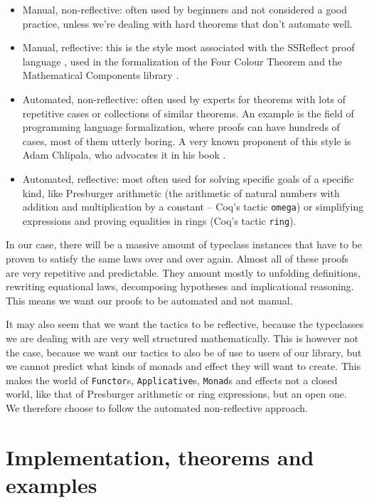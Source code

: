 \documentclass[declaration,inz,english,shortabstract]{iithesis}
\newcommand{\m}[1]{\texttt{#1}}
\begin{document}
\begin{itemize}
    \item Manual, non-reflective: often used by beginners and not considered a good practice, unless we're dealing with hard theorems that don't automate well.
    \item Manual, reflective: this is the style most associated with the SSReflect proof language \cite{SSReflect1} \cite{SSReflect2}, used in the formalization of the Four Colour Theorem \cite{FourColour1} \cite{FourColour2} and the Mathematical Components library \cite{MCB}.
    \item Automated, non-reflective: often used by experts for theorems with lots of repetitive cases or collections of similar theorems. An example is the field of programming language formalization, where proofs can have hundreds of cases, most of them utterly boring. A very known proponent of this style is Adam Chlipala, who advocates it in his book \cite{CPDT}.
    \item Automated, reflective: most often used for solving specific goals of a specific kind, like Presburger arithmetic (the arithmetic of natural numbers with addition and multiplication by a constant -- Coq's tactic \m{omega}) or simplifying expressions and proving equalities in rings (Coq's tactic \m{ring}).
\end{itemize}

In our case, there will be a massive amount of typeclass instances that have to be proven to satisfy the same laws over and over again. Almost all of these proofs are very repetitive and predictable. They amount mostly to unfolding definitions, rewriting equational laws, decomposing hypotheses and implicational reasoning. This means we want our proofs to be automated and not manual.

It may also seem that we want the tactics to be reflective, because the typeclasses we are dealing with are very well structured mathematically. This is however not the case, because we want our tactics to also be of use to users of our library, but we cannot predict what kinds of monads and effect they will want to create. This makes the world of \m{Functor}s, \m{Applicative}s, \m{Monad}s and effects not a closed world, like that of Presburger arithmetic or ring expressions, but an open one. We therefore choose to follow the automated non-reflective approach.

\chapter{Implementation, theorems and examples} \label{ch4}
\end{document}
